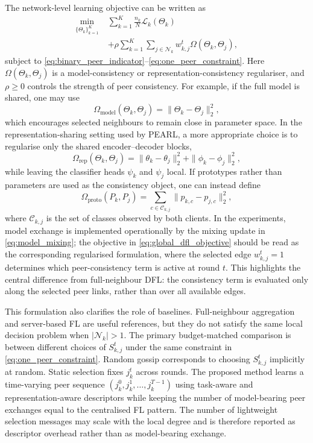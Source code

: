 \documentclass[conference]{IEEEtran}
\newcommand{\rev}[1]{#1}
\begin{document}
The network-level learning objective can be written as
\begin{equation}
\begin{aligned}
    \min_{\{\Theta_k\}_{k=1}^{K}}\;&
    \sum_{k=1}^{K}\frac{n_k}{N}\mathcal{L}_k(\Theta_k) \\
    &+\rho\sum_{k=1}^{K}\sum_{j\in\mathcal{N}_k}
    w_{k,j}^{t}\Omega(\Theta_k,\Theta_j),
\end{aligned}
    \label{eq:global_dfl_objective}
\end{equation}
subject to \eqref{eq:binary_peer_indicator}--\eqref{eq:one_peer_constraint}. Here $\Omega(\Theta_k,\Theta_j)$ is a model-consistency or representation-consistency regulariser, and $\rho\geq0$ controls the strength of peer consistency. For example, if the full model is shared, one may use
\begin{equation*}
    \Omega_{\mathrm{model}}(\Theta_k,\Theta_j)
    =
    \|\Theta_k-\Theta_j\|_2^2,
\end{equation*}
which encourages selected neighbours to remain close in parameter space. In the representation-sharing setting used by PEARL, a more appropriate choice is to regularise only the shared encoder--decoder blocks,
\begin{equation*}
    \Omega_{\mathrm{rep}}(\Theta_k,\Theta_j)
    =
    \|\theta_k-\theta_j\|_2^2
    +
    \|\phi_k-\phi_j\|_2^2,
\end{equation*}
while leaving the classifier heads $\psi_k$ and $\psi_j$ local. If prototypes rather than parameters are used as the consistency object, one can instead define
\begin{equation*}
    \Omega_{\mathrm{proto}}(P_k,P_j)
    =
    \sum_{c\in\mathcal{C}_{k,j}}
    \|p_{k,c}-p_{j,c}\|_2^2,
\end{equation*}
where $\mathcal{C}_{k,j}$ is the set of classes observed by both clients. In the experiments, model exchange is implemented operationally by the mixing update in \eqref{eq:model_mixing}; the objective in \eqref{eq:global_dfl_objective} should be read as the corresponding regularised formulation, where the selected edge $w_{k,j}^t=1$ determines which peer-consistency term is active at round $t$. This highlights the central difference from full-neighbour DFL: the consistency term is evaluated only along the selected peer links, rather than over all available edges.

This formulation also clarifies the role of baselines. Full-neighbour aggregation and server-based FL are useful references, but they do not satisfy the same local decision problem when $|\mathcal{N}_k|>1$. The primary budget-matched comparison is between different choices of $S_{k,j}^{t}$ under the same constraint in \eqref{eq:one_peer_constraint}. Random gossip corresponds to choosing $S_{k,j}^{t}$ implicitly at random. Static selection fixes $j_k^t$ across rounds. The proposed method learns a time-varying peer sequence $(j_k^0,j_k^1,\dots,j_k^{T-1})$ using task-aware and representation-aware descriptors while keeping the number of \rev{model-bearing peer exchanges} equal to the centralised FL pattern. \rev{The number of lightweight selection messages may scale with the local degree and is therefore reported as descriptor overhead rather than as model-bearing exchange.}
\end{document}
